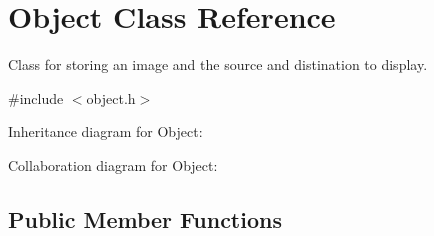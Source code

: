\hypertarget{classObject}{}\section{Object Class Reference}
\label{classObject}


Class for storing an image and the source and distination to display.  




{\ttfamily \#include $<$object.\+h$>$}



Inheritance diagram for Object\+:


Collaboration diagram for Object\+:
\subsection*{Public Member Functions}
